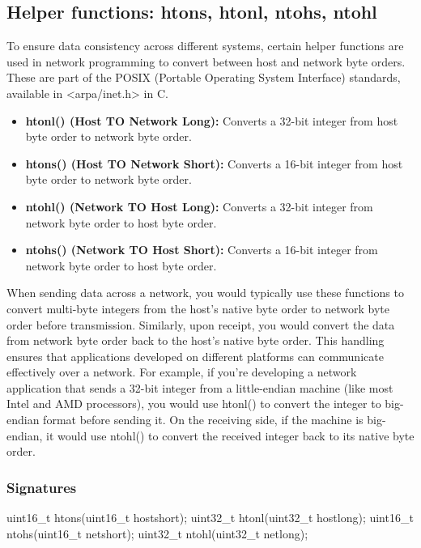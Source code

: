 \documentclass{report}
\begin{document}
    \subsection{Helper functions: htons, htonl, ntohs, ntohl}
    \bigbreak \noindent 
    To ensure data consistency across different systems, certain helper functions are used in network programming to convert between host and network byte orders. These are part of the POSIX (Portable Operating System Interface) standards, available in <arpa/inet.h> in C.
    \begin{itemize}
        \item \textbf{htonl() (Host TO Network Long):} Converts a 32-bit integer from host byte order to network byte order.
        \item \textbf{htons() (Host TO Network Short):} Converts a 16-bit integer from host byte order to network byte order.
        \item \textbf{ntohl() (Network TO Host Long):} Converts a 32-bit integer from network byte order to host byte order.
        \item \textbf{ntohs() (Network TO Host Short):} Converts a 16-bit integer from network byte order to host byte order.
    \end{itemize}
    \bigbreak \noindent 
    When sending data across a network, you would typically use these functions to convert multi-byte integers from the host's native byte order to network byte order before transmission. Similarly, upon receipt, you would convert the data from network byte order back to the host's native byte order. This handling ensures that applications developed on different platforms can communicate effectively over a network.
    \bigbreak \noindent 
    For example, if you're developing a network application that sends a 32-bit integer from a little-endian machine (like most Intel and AMD processors), you would use htonl() to convert the integer to big-endian format before sending it. On the receiving side, if the machine is big-endian, it would use ntohl() to convert the received integer back to its native byte order.
    \bigbreak \noindent 
    \subsubsection{Signatures}
    \bigbreak \noindent 
    \begin{cppcode}
        uint16_t htons(uint16_t hostshort);
        uint32_t htonl(uint32_t hostlong);
        uint16_t ntohs(uint16_t netshort);
        uint32_t ntohl(uint32_t netlong);
    \end{cppcode}
\end{document}
